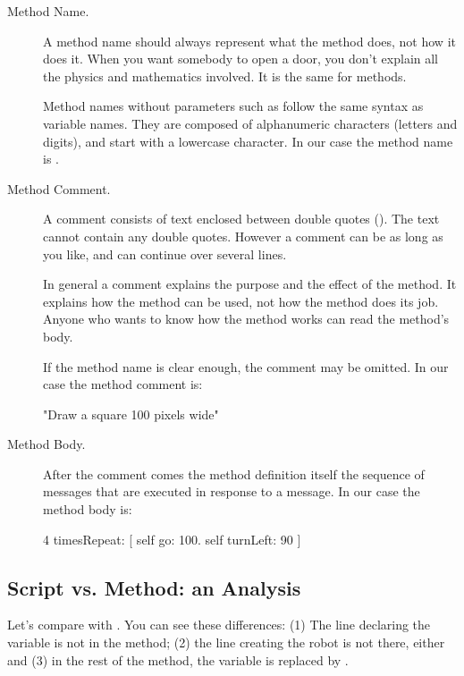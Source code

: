
\begin{description}

\item[Method Name.] 
A method name should always represent what the method does, not how it does it.  When you want somebody to open a door, 
you don't explain all the physics and mathematics involved. It is the 
same for methods. 

Method names without parameters such as 
 follow the same syntax as variable names. They are 
composed of alphanumeric characters (letters and digits), and start with a
lowercase character. In our case the method name is .

\item[Method Comment.]
A comment consists of text enclosed between double quotes
(). The text cannot contain any double quotes. However a
comment can be as long as you like, and can continue
over several lines. 


In general a comment explains the purpose and the effect of the method. It explains how the method can be used, not how the method does its job. Anyone who wants to know how the method works can read the method's body.


If the method name is clear enough, the comment may be omitted.  
In our case the method comment is:
\begin{nalltt}
   "Draw a square 100 pixels wide"
\end{nalltt}

\item[Method Body.] After the comment comes the method definition itself
\ie the sequence of messages that are executed in response to a message. In our case the 
method body is: 
\


\begin{nalltt}
   4 timesRepeat: 
         [ self go: 100.
         self turnLeft: 90 ]
\end{nalltt}
\end{description}
       

\subsection{Script vs. Method: an Analysis}
Let's compare   with . You can see these differences: (1) The line declaring the variable \caro is not in the method; (2) the line creating the robot is not there, either and (3) in the rest of the method, the variable \caro is replaced by \self.


